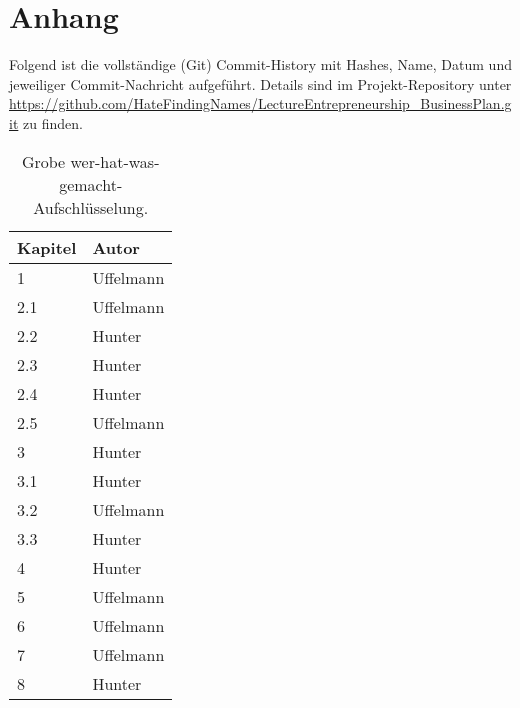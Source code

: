 \chapter{Anhang}

Folgend ist die vollständige (Git) Commit-History mit Hashes, Name, Datum und jeweiliger Commit-Nachricht aufgeführt.
Details sind im Projekt-Repository unter \url{https://github.com/HateFindingNames/LectureEntrepreneurship_BusinessPlan.git} zu finden.\par\medskip


\begin{table}[h]
    \centering
    \caption[Grobe wer-hat-was-gemacht-Aufschlüsselung]{Grobe wer-hat-was-gemacht-Aufschlüsselung.}\label{tab:wermachtwas}
    \begin{tabular}{@{}ll@{}}
        \toprule
        Kapitel&	Autor\\
        \midrule
        1	&Uffelmann\\
        2.1	&Uffelmann\\
        2.2	&Hunter\\
        2.3	&Hunter\\
        2.4	&Hunter\\
        2.5	&Uffelmann\\
        3	&Hunter\\
        3.1	&Hunter\\
        3.2	&Uffelmann\\
        3.3	&Hunter\\
        4	&Hunter\\
        5	&Uffelmann\\
        6	&Uffelmann\\
        7	&Uffelmann\\
        8	&Hunter\\
        \bottomrule
    \end{tabular}
\end{table}